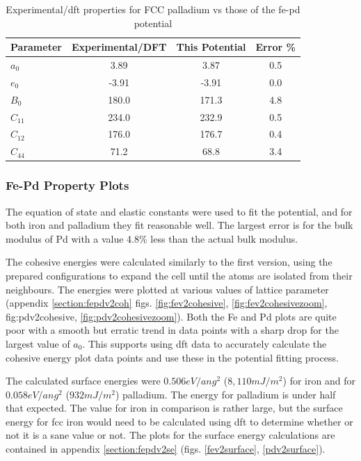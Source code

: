 \begin{table}[ht]
\renewcommand{\arraystretch}{1.2}
\begin{tabular}{lccc}
\hline\hline
Parameter & Experimental/DFT & This Potential & Error \%\\
\hline\hline
$a_0$ & 3.89 & 3.87 & 0.5 \\
$e_0$ & -3.91  & -3.91 & 0.0 \\
$B_0$ & 180.0  & 171.3 & 4.8 \\
$C_{11}$ & 234.0  & 232.9 & 0.5 \\
$C_{12}$ & 176.0  & 176.7 & 0.4 \\
$C_{44}$ & 71.2  & 68.8 & 3.4 \\
\hline\hline
\end{tabular}
\caption{Experimental/dft properties for FCC palladium vs those of the fe-pd potential}
\label{table:palladiumpotcalc2}
\end{table}

\FloatBarrier
\subsubsection{Fe-Pd Property Plots}

The equation of state and elastic constants were used to fit the potential, and for both iron and palladium they fit reasonable well.  The largest error is for the bulk modulus of Pd with a value 4.8\% less than the actual bulk modulus.

The cohesive energies were calculated similarly to the first version, using the prepared configurations to expand the cell until the atoms are isolated from their neighbours.  The energies were plotted at various values of lattice parameter (appendix \ref{section:fepdv2coh} figs. \ref{fig:fev2cohesive}, \ref{fig:fev2cohesivezoom}, {fig:pdv2cohesive}, \ref{fig:pdv2cohesivezoom}).  Both the Fe and Pd plots are quite poor with a smooth but erratic trend in data points with a sharp drop for the largest value of $a_0$.  This supports using \acrshort{dft} data to accurately calculate the cohesive energy plot data points and use these in the potential fitting process.


The calculated surface energies were $0.506eV/ang^2$ ($8,110 mJ/m^2$) for iron and for $0.058eV/ang^2$ ($932 mJ/m^2$) palladium.  The energy for palladium is under half that expected.  The value for iron in comparison is rather large, but the surface energy for \acrshort{fcc} iron would need to be calculated using \acrshort{dft} to determine whether or not it is a sane value or not.  The plots for the surface energy calculations are contained in appendix \ref{section:fepdv2se} (figs. \ref{fev2surface}, \ref{pdv2surface}).




